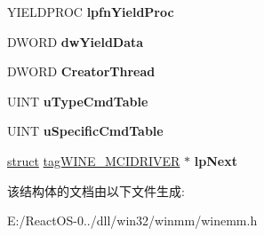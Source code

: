\begin{DoxyCompactItemize}
Y\+I\+E\+L\+D\+P\+R\+OC {\bfseries lpfn\+Yield\+Proc}
\item 
\mbox{\label{structtag_w_i_n_e___m_c_i_d_r_i_v_e_r_aa90e8d4151c0035c64831fc6704a0558}} 
D\+W\+O\+RD {\bfseries dw\+Yield\+Data}
\item 
\mbox{\label{structtag_w_i_n_e___m_c_i_d_r_i_v_e_r_a040b58df6d4c7d4585c5bfa9cb25c0c4}} 
D\+W\+O\+RD {\bfseries Creator\+Thread}
\item 
\mbox{\label{structtag_w_i_n_e___m_c_i_d_r_i_v_e_r_ae68bd197a26fc5c1eafb06c00a5b77c2}} 
U\+I\+NT {\bfseries u\+Type\+Cmd\+Table}
\item 
\mbox{\label{structtag_w_i_n_e___m_c_i_d_r_i_v_e_r_a67c07e22cdec684620c5b69df629ae6f}} 
U\+I\+NT {\bfseries u\+Specific\+Cmd\+Table}
\item 
\mbox{\label{structtag_w_i_n_e___m_c_i_d_r_i_v_e_r_afb018df4608bcd1e9231aae2fef81ecc}} 
\hyperlink{interfacestruct}{struct} \hyperlink{structtag_w_i_n_e___m_c_i_d_r_i_v_e_r}{tag\+W\+I\+N\+E\+\_\+\+M\+C\+I\+D\+R\+I\+V\+ER} $\ast$ {\bfseries lp\+Next}
\end{DoxyCompactItemize}


该结构体的文档由以下文件生成\+:\begin{DoxyCompactItemize}
\item 
E\+:/\+React\+O\+S-\/0../dll/win32/winmm/winemm.\+h\end{DoxyCompactItemize}
